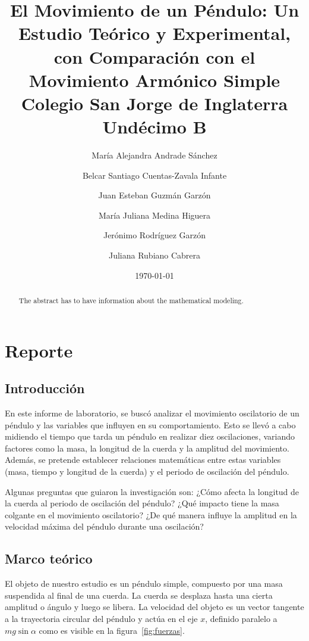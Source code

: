 \documentclass[letterpaper]{report}
\title{
  El Movimiento de un Péndulo: Un Estudio Teórico y Experimental, con
  Comparación con el Movimiento Armónico Simple \\
  {\large Colegio San Jorge de Inglaterra \\
  Undécimo B}
}
\author{
  María Alejandra Andrade Sánchez \and
  Belcar Santiago Cuentas-Zavala Infante \and
  Juan Esteban Guzmán Garzón \and
  María Juliana Medina Higuera \and
  Jerónimo Rodríguez Garzón \and
  Juliana Rubiano Cabrera
}
\date{\today}
\numberwithin{table}{section}
\begin{document}
\maketitle

\tableofcontents

\chapter{Reporte}

\begin{abstract}
  {\color{red} The abstract has to have information
  about the mathematical modeling.}
\end{abstract}

\section{Introducción}

En este informe de laboratorio, se buscó analizar el movimiento
oscilatorio de un péndulo y las variables que influyen en su
comportamiento. Esto se llevó a cabo midiendo el tiempo que tarda un
péndulo en realizar diez oscilaciones, variando factores como la
masa, la longitud de la cuerda y la amplitud del movimiento. Además,
se pretende establecer relaciones matemáticas entre estas variables
(masa, tiempo y longitud de la cuerda) y el periodo de oscilación del
péndulo.

Algunas preguntas que guiaron la investigación son: ¿Cómo
afecta la longitud de la cuerda al periodo de oscilación del péndulo?
¿Qué impacto tiene la masa colgante en el movimiento oscilatorio? ¿De
qué manera influye la amplitud en la velocidad máxima del péndulo
durante una oscilación?

\section{Marco teórico}

El objeto de nuestro estudio es un péndulo simple, compuesto por una masa
suspendida al final de una cuerda. La cuerda se desplaza hasta una
cierta amplitud o ángulo y luego se libera. La velocidad del objeto
es un vector tangente a la trayectoria circular del péndulo y actúa
en el eje $x$, definido paralelo a $mg\sin{\alpha}$ como es visible
en la figura~\ref{fig:fuerzas}.
\end{document}
